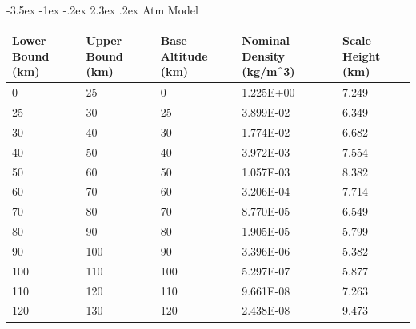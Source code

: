 \documentclass[a4paper, 12pt]{article}
\makeatletter
\renewcommand\section{\clearpage\newpage\@startsection {section}{1}{\z@}%
	{-3.5ex \@plus -1ex \@minus -.2ex}%
	{2.3ex \@plus.2ex}%
	{\normalfont\Large\bfseries}}
\makeatother
\begin{document}
\begin{appendices}
\section{Atm Model}
\begin{table}[h!]
	{
	\centering
	\begin{tabular}{lllll}\hline
		Lower Bound (km) & Upper Bound (km) & Base Altitude (km) & Nominal Density (kg/m\textasciicircum{}3) & Scale Height (km) \\ \hline
		0                         & 25                        & 0                  & 1.225E+00                                 & 7.249             \\ \hline
		25                        & 30                        & 25                 & 3.899E-02                                 & 6.349             \\ \hline
		30                        & 40                        & 30                 & 1.774E-02                                 & 6.682             \\ \hline
		40                        & 50                        & 40                 & 3.972E-03                                 & 7.554             \\ \hline
		50                        & 60                        & 50                 & 1.057E-03                                 & 8.382             \\ \hline
		60                        & 70                        & 60                 & 3.206E-04                                 & 7.714             \\ \hline
		70                        & 80                        & 70                 & 8.770E-05                                 & 6.549             \\ \hline
		80                        & 90                        & 80                 & 1.905E-05                                 & 5.799             \\ \hline
		90                        & 100                       & 90                 & 3.396E-06                                 & 5.382             \\ \hline
		100                       & 110                       & 100                & 5.297E-07                                 & 5.877             \\ \hline
		110                       & 120                       & 110                & 9.661E-08                                 & 7.263             \\ \hline
		120                       & 130                       & 120                & 2.438E-08                                 & 9.473             \\ \hline

\end{tabular}}
\end{table}
\end{appendices}
\end{document}
